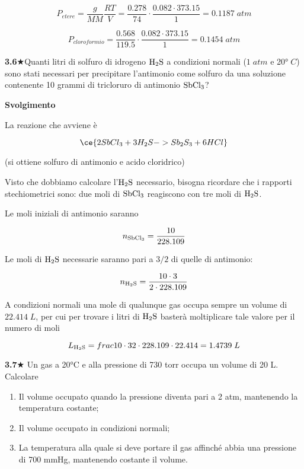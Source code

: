 $$P_{etere}=\frac{g}{MM}\frac{RT}{V}=\frac{0.278}{74}\cdot\frac{0.082 \cdot 373.15}{1}=0.1187\;atm$$

$$P_{cloroformio}=\frac{0.568}{119.5}\cdot\frac{0.082 \cdot 373.15}{1}=0.1454\;atm$$

\vspace{0.2cm}\textbf{3.6}$\bigstar$Quanti litri di solfuro di idrogeno $\rm H_2S$ a condizioni normali ($1\;atm$ e 20°$\;C$) sono stati necessari per precipitare l'antimonio come solfuro da una soluzione contenente 10 grammi di tricloruro di antimonio $\rm SbCl_3$?

\vspace{0.2cm}\large\textbf{Svolgimento}\normalsize

\vspace{0.2cm}La reazione che avviene è

$$\ce{2SbCl_3 + 3H_2S -> Sb_2S_3 + 6HCl}$$

(si ottiene solfuro di antimonio e acido cloridrico)

Visto che dobbiamo calcolare l'$\rm H_2S$ necessario, bisogna ricordare che i rapporti stechiometrici sono: due moli di $\rm SbCl_3$ reagiscono con tre moli di $\rm H_2S$.

Le moli iniziali di antimonio saranno

$$n_{\rm SbCl_3}=\frac{10}{228.109}$$

Le moli di $\rm H_2S$ necessarie saranno pari a $3/2$ di quelle di antimonio:

$$n_{\rm H_2S}=\frac{10 \cdot 3}{2 \cdot 228.109}$$

A condizioni normali una mole di qualunque gas occupa sempre un volume di $22.414\;L$, per cui per trovare i litri di $\rm H_2S$ basterà moltiplicare tale valore per il numero di moli

$$L_{\rm H_2S}=frac{10 \cdot 3}{2 \cdot 228.109} \cdot 22.414
=1.4739\;L$$

\vspace{0.2cm}\textbf{3.7}$\bigstar$ Un gas a 20°C e alla pressione di 730 torr occupa un volume di 20 L. Calcolare

\begin{enumerate}
    \item Il volume occupato quando la pressione diventa pari a 2 atm, mantenendo la temperatura costante;
    \item Il volume occupato in condizioni normali;
    \item La temperatura alla quale si deve portare il gas affinché abbia una pressione di 700 mmHg, mantenendo costante il volume.
\end{enumerate}

